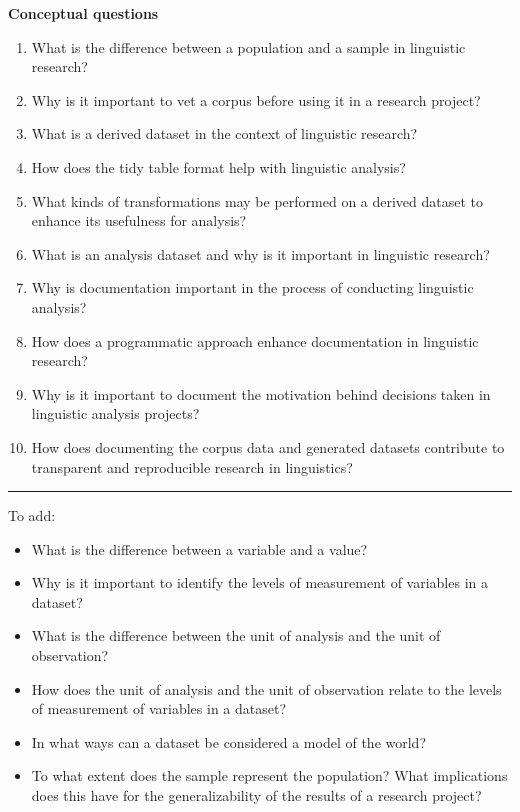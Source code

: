 \documentclass[
  letterpaper,
]{latex/krantz}
\providecommand{\tightlist}{%
  \setlength{\itemsep}{0pt}\setlength{\parskip}{0pt}}\usepackage{longtable,booktabs,array}
\begin{document}
\begin{tcolorbox}[enhanced jigsaw, arc=.35mm, leftrule=.75mm, rightrule=.15mm, opacityback=0, colback=white, breakable, bottomrule=.15mm, left=2mm, toprule=.15mm]

\textbf{Conceptual questions}

\begin{enumerate}
\def\labelenumi{\arabic{enumi}.}
\item
  What is the difference between a population and a sample in linguistic
  research?
\item
  Why is it important to vet a corpus before using it in a research
  project?
\item
  What is a derived dataset in the context of linguistic research?
\item
  How does the tidy table format help with linguistic analysis?
\item
  What kinds of transformations may be performed on a derived dataset to
  enhance its usefulness for analysis?
\item
  What is an analysis dataset and why is it important in linguistic
  research?
\item
  Why is documentation important in the process of conducting linguistic
  analysis?
\item
  How does a programmatic approach enhance documentation in linguistic
  research?
\item
  Why is it important to document the motivation behind decisions taken
  in linguistic analysis projects?
\item
  How does documenting the corpus data and generated datasets contribute
  to transparent and reproducible research in linguistics?
\end{enumerate}

\begin{center}\rule{0.5\linewidth}{0.5pt}\end{center}

To add:

\begin{itemize}
\tightlist
\item
  What is the difference between a variable and a value?
\item
  Why is it important to identify the levels of measurement of variables
  in a dataset?
\item
  What is the difference between the unit of analysis and the unit of
  observation?
\item
  How does the unit of analysis and the unit of observation relate to
  the levels of measurement of variables in a dataset?
\item
  In what ways can a dataset be considered a model of the world?
\item
  To what extent does the sample represent the population? What
  implications does this have for the generalizability of the results of
  a research project?
\end{itemize}

\end{tcolorbox}
\end{document}
